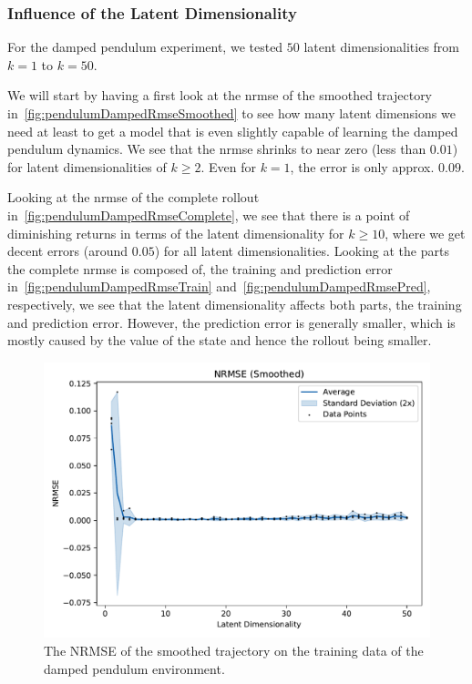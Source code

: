 		\subsubsection{Influence of the Latent Dimensionality}
			For the damped pendulum experiment, we tested \(50\) latent dimensionalities from \( k = 1 \) to \( k = 50 \).

			We will start by having a first look at the \ac{nrmse} of the smoothed trajectory in~\autoref{fig:pendulumDampedRmseSmoothed} to see how many latent dimensions we need at least to get a model that is even slightly capable of learning the damped pendulum dynamics. We see that the \ac{nrmse} shrinks to near zero (less than \( 0.01 \)) for latent dimensionalities of \( k \geq 2 \). Even for \( k = 1 \), the error is only approx. \( 0.09 \).

			Looking at the \ac{nrmse} of the complete rollout in~\autoref{fig:pendulumDampedRmseComplete}, we see that there is a point of diminishing returns in terms of the latent dimensionality for \( k \geq 10 \), where we get decent errors (around \( 0.05 \)) for all latent dimensionalities. Looking at the parts the complete \ac{nrmse} is composed of, the training and prediction error in~\autoref{fig:pendulumDampedRmseTrain} and~\autoref{fig:pendulumDampedRmsePred}, respectively, we see that the latent dimensionality affects both parts, the training and prediction error. However, the prediction error is generally smaller, which is mostly caused by the value of the state and hence the rollout being smaller.

			\begin{figure}
				\centering
				\includegraphics[width=0.7\linewidth]{figures/results/pendulum-damped/latent-dim/comparison-rmse-smoothed-normalized-mean-vs-latent-dim.pdf}
				\caption[Error of the smoothed trajectory on the training data of the damped pendulum experiment]{The NRMSE of the smoothed trajectory on the training data of the damped pendulum environment.}
				\label{fig:pendulumDampedRmseSmoothed}
			\end{figure}

